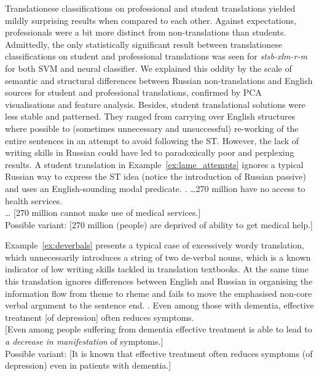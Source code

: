 Translationese classifications on professional and student translations yielded mildly surprising results when compared to each other. Against expectations, professionals were a bit more distinct from non-translations than students. Admittedly, the only statistically significant result between translationese classifications on student and professional translations was seen for \textit{stsb-xlm-r-m} for both SVM and neural classifier.  
We explained this oddity by the scale of semantic and structural differences between Russian non-translations and English sources for student and professional translations, confirmed by PCA visualisations and feature analysis. 
Besides, student translational solutions were less stable and patterned. They ranged from carrying over English structures where possible to (sometimes unnecessary and unsuccessful) re-working of the entire sentences in an attempt to avoid following the ST. However, the lack of writing skills in Russian could have led to paradoxically poor and perplexing results. 
A student translation in Example~\ref{ex:lame_attempts} ignores a typical Russian way to express the ST idea (notice the introduction of Russian passive) and uses an English-sounding modal predicate.
\ex. \label{ex:lame_attempts}\hspace{1pt}
\dots 270 million have no access to health services.\\
\dots {} [270 million cannot make use of medical services.]\\
Possible variant:  [270 million (people) are deprived of ability to get medical help.]

Example~\ref{ex:deverbals} presents a typical case of excessively wordy translation, which unnecessarily introduces a string of two de-verbal nouns, which is a known indicator of low writing skills tackled in translation textbooks. At the same time this translation ignores differences between English and Russian in organising the information flow from theme to rheme and fails to move the emphasised non-core verbal argument to the sentence end.  
\ex. \label{ex:deverbals}\hspace{1pt}
Even among those with dementia, effective treatment [of depression] often reduces symptoms.\\
 [Even among people suffering from dementia effective treatment is able to lead to \textit{a decrease in manifestation} of symptoms.]\\
Possible variant:  [It is known that effective treatment often reduces symptoms (of depression) even in patients with dementia.]

